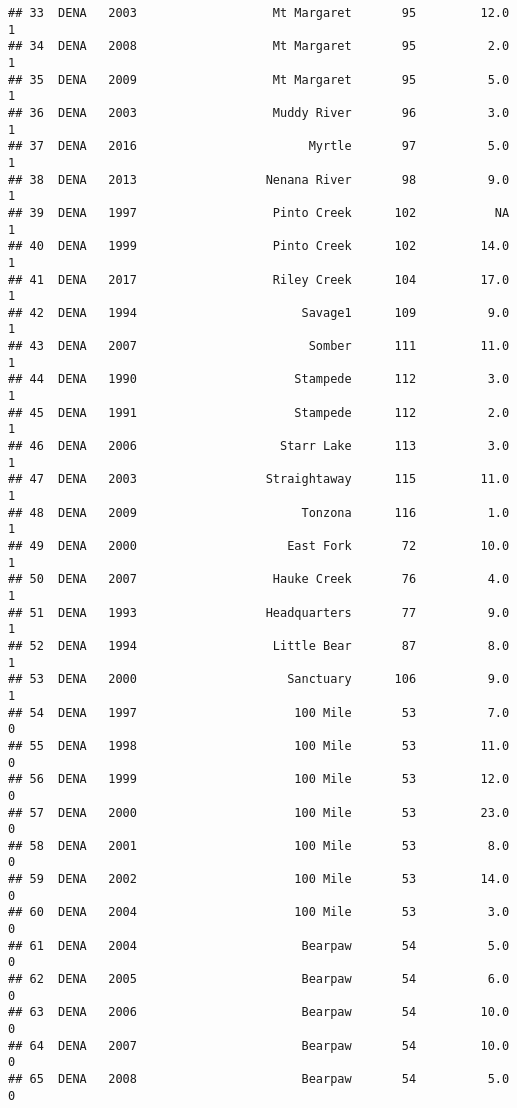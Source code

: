 \documentclass[
]{article}
\begin{document}
\begin{verbatim}
## 33  DENA   2003                   Mt Margaret       95         12.0       1
## 34  DENA   2008                   Mt Margaret       95          2.0       1
## 35  DENA   2009                   Mt Margaret       95          5.0       1
## 36  DENA   2003                   Muddy River       96          3.0       1
## 37  DENA   2016                        Myrtle       97          5.0       1
## 38  DENA   2013                  Nenana River       98          9.0       1
## 39  DENA   1997                   Pinto Creek      102           NA       1
## 40  DENA   1999                   Pinto Creek      102         14.0       1
## 41  DENA   2017                   Riley Creek      104         17.0       1
## 42  DENA   1994                       Savage1      109          9.0       1
## 43  DENA   2007                        Somber      111         11.0       1
## 44  DENA   1990                      Stampede      112          3.0       1
## 45  DENA   1991                      Stampede      112          2.0       1
## 46  DENA   2006                    Starr Lake      113          3.0       1
## 47  DENA   2003                  Straightaway      115         11.0       1
## 48  DENA   2009                       Tonzona      116          1.0       1
## 49  DENA   2000                     East Fork       72         10.0       1
## 50  DENA   2007                   Hauke Creek       76          4.0       1
## 51  DENA   1993                  Headquarters       77          9.0       1
## 52  DENA   1994                   Little Bear       87          8.0       1
## 53  DENA   2000                     Sanctuary      106          9.0       1
## 54  DENA   1997                      100 Mile       53          7.0       0
## 55  DENA   1998                      100 Mile       53         11.0       0
## 56  DENA   1999                      100 Mile       53         12.0       0
## 57  DENA   2000                      100 Mile       53         23.0       0
## 58  DENA   2001                      100 Mile       53          8.0       0
## 59  DENA   2002                      100 Mile       53         14.0       0
## 60  DENA   2004                      100 Mile       53          3.0       0
## 61  DENA   2004                       Bearpaw       54          5.0       0
## 62  DENA   2005                       Bearpaw       54          6.0       0
## 63  DENA   2006                       Bearpaw       54         10.0       0
## 64  DENA   2007                       Bearpaw       54         10.0       0
## 65  DENA   2008                       Bearpaw       54          5.0       0

\end{verbatim}
\end{document}
